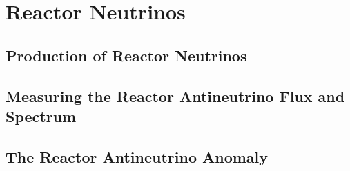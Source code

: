 \chapter{Reactor Neutrinos}

\section{Production of Reactor Neutrinos}

\section{Measuring the Reactor Antineutrino Flux and Spectrum}

\section{The Reactor Antineutrino Anomaly}
